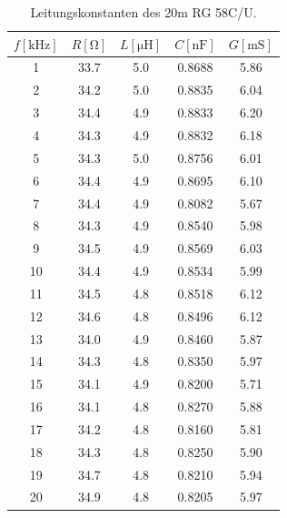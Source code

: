 \begin{table}
\centering
	\caption[]{Leitungskonstanten des 20m RG 58C/U.}
	\begin{tabular}{S[table-format=2.0] S[table-format=2.1] S[table-format=1.1] S[table-format=1.4] S[table-format=1.2]}
	\toprule
        {$f[\si{\kilo\hertz}]$} & {$R[\si{\ohm}]$} & {$L[\si{\micro\henry}]$} & {$C[\si{\nano \farad}]$} & {$G[\si{\milli\siemens}]$} \\
			 &	33.7	&	5.0	&	0.8688	&	5.86\\
			  2	 &	34.2	&	5.0	&	0.8835	&	6.04\\
			  3	 &	34.4	&	4.9	&	0.8833	&	6.20\\
			  4	 &	34.3	&	4.9	&	0.8832	&	6.18\\
			  5	 &	34.3	&	5.0	&	0.8756	&	6.01\\
			  6	 &	34.4	&	4.9	&	0.8695	&	6.10\\
			  7	 &	34.4	&	4.9	&	0.8082	&	5.67\\
			  8	 &	34.3	&	4.9	&	0.8540	&	5.98\\
			  9	 &	34.5	&	4.9	&	0.8569	&	6.03\\
			 10  &	34.4	&	4.9	&	0.8534	&	5.99\\
			 11	 &	34.5	&	4.8	&	0.8518	&	6.12\\
			 12	 &	34.6	&	4.8	&	0.8496	&	6.12\\
			 13	 &	34.0	&	4.9	&	0.8460	&	5.87\\
			 14	 &	34.3	&	4.8	&	0.8350	&	5.97\\
			 15	 &	34.1	&	4.9	&	0.8200	&	5.71\\
			 16	 &	34.1	&	4.8	&	0.8270	&	5.88\\
			 17	 &	34.2	&	4.8	&	0.8160	&	5.81\\
			 18	 &	34.3	&	4.8	&	0.8250	&	5.90\\
			 19	 &	34.7	&	4.8	&	0.8210	&	5.94\\
			 20	 &	34.9	&	4.8	&	0.8205	&	5.97\\
			\bottomrule
	\end{tabular}
	\label{tab_konst2}
\end{table}

